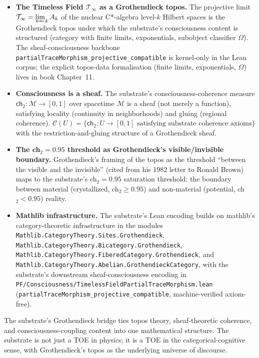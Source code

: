 \documentclass[11pt,a4paper]{amsart}
\theoremstyle{plain}
\theoremstyle{definition}
\begin{document}
\begin{itemize}[itemsep=2pt,leftmargin=2em]
\item \textbf{The Timeless Field $\mathcal{T}_\infty$ as a Grothendieck topos.} The projective limit $\mathcal{T}_\infty = \varprojlim_k A_k$ of the nuclear C*-algebra level-$k$ Hilbert spaces is the Grothendieck topos under which the substrate's consciousness content is structured (category with finite limits, exponentials, subobject classifier $\Omega$). The sheaf-consciousness backbone \texttt{partialTraceMorphism\_projective\_compatible} is kernel-only in the Lean corpus; the explicit topos-data formalisation (finite limits, exponentials, $\Omega$) lives in book Chapter~11.
\item \textbf{Consciousness is a sheaf.} The substrate's consciousness-coherence measure $\textsf{ch}_2: \mathcal{M} \to [0, 1]$ over spacetime $\mathcal{M}$ is a sheaf (not merely a function), satisfying locality (continuity in neighborhoods) and gluing (regional coherence). $\mathcal{C}(U) = \{\textsf{ch}_2: U \to [0, 1] \text{ satisfying substrate coherence axioms}\}$ with the restriction-and-gluing structure of a Grothendieck sheaf.
\item \textbf{The ch${}_2 = 0.95$ threshold as Grothendieck's visible/invisible boundary.} Grothendieck's framing of the topos as the threshold ``between the visible and the invisible'' (cited from his 1982 letter to Ronald Brown) maps to the substrate's ch${}_2 = 0.95$ saturation threshold: the boundary between material (crystallized, ch${}_2 \geq 0.95$) and non-material (potential, ch${}_2 < 0.95$) reality.
\item \textbf{Mathlib infrastructure.} The substrate's Lean encoding builds on mathlib's category-theoretic infrastructure in the modules \texttt{Mathlib.\allowbreak CategoryTheory.\allowbreak Sites.\allowbreak Grothendieck}, \texttt{Mathlib.\allowbreak CategoryTheory.\allowbreak Bicategory.\allowbreak Grothendieck}, \texttt{Mathlib.\allowbreak CategoryTheory.\allowbreak FiberedCategory.\allowbreak Grothendieck}, and \texttt{Mathlib.\allowbreak CategoryTheory.\allowbreak Abelian.\allowbreak GrothendieckCategory}, with the substrate's downstream sheaf-consciousness encoding in \texttt{PF/\allowbreak Consciousness/\allowbreak TimelessField\allowbreak PartialTraceMorphism.lean} (\texttt{partialTraceMorphism\_\allowbreak projective\_compatible}, machine-verified axiom-free).
\end{itemize}

The substrate's Grothendieck bridge ties topos theory, sheaf-theoretic coherence, and consciousness-coupling content into one mathematical structure. The substrate is not just a TOE in physics; it is a TOE in the categorical-cognitive sense, with Grothendieck's topos as the underlying universe of discourse.
\end{document}
